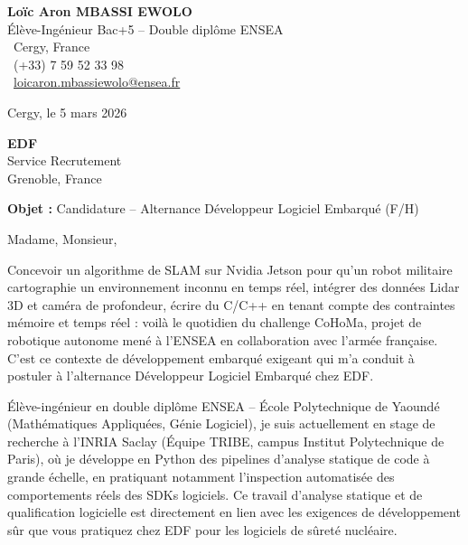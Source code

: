 \documentclass[a4paper,11pt]{article}
\begin{document}
\noindent
\begin{minipage}[t]{0.5\textwidth}
    \textbf{Loïc Aron MBASSI EWOLO}\\
    Élève-Ingénieur Bac+5 -- Double diplôme ENSEA\\[3pt]
    \faMapMarker\ Cergy, France\\
    \faPhone\ (+33) 7 59 52 33 98\\
    \faEnvelope\ \href{mailto:loicaron.mbassiewolo@ensea.fr}{loicaron.mbassiewolo@ensea.fr}
\end{minipage}
\hfill
\begin{minipage}[t]{0.4\textwidth}
    \raggedleft
    Cergy, le 5 mars 2026
\end{minipage}

\vspace{1.2cm}

\hfill
\begin{minipage}[t]{0.5\textwidth}
    \raggedleft
    \textbf{EDF}\\
    Service Recrutement\\
    Grenoble, France
\end{minipage}

\vspace{1cm}

\noindent\textbf{Objet :} Candidature -- Alternance Développeur Logiciel Embarqué (F/H)

\vspace{0.8cm}

Madame, Monsieur,

Concevoir un algorithme de SLAM sur Nvidia Jetson pour qu'un robot militaire cartographie un environnement inconnu en temps réel, intégrer des données Lidar 3D et caméra de profondeur, écrire du C/C++ en tenant compte des contraintes mémoire et temps réel : voilà le quotidien du challenge CoHoMa, projet de robotique autonome mené à l'ENSEA en collaboration avec l'armée française. C'est ce contexte de développement embarqué exigeant qui m'a conduit à postuler à l'alternance Développeur Logiciel Embarqué chez EDF.

Élève-ingénieur en double diplôme ENSEA -- École Polytechnique de Yaoundé (Mathématiques Appliquées, Génie Logiciel), je suis actuellement en stage de recherche à l'INRIA Saclay (Équipe TRIBE, campus Institut Polytechnique de Paris), où je développe en Python des pipelines d'analyse statique de code à grande échelle, en pratiquant notamment l'inspection automatisée des comportements réels des SDKs logiciels. Ce travail d'analyse statique et de qualification logicielle est directement en lien avec les exigences de développement sûr que vous pratiquez chez EDF pour les logiciels de sûreté nucléaire.
\end{document}
